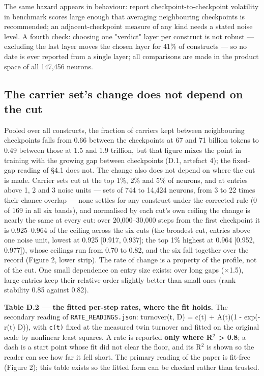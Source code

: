 \documentclass{article}
\begin{document}
The same hazard appears in behaviour: \citet{nishida2025} report checkpoint-to-checkpoint volatility in benchmark scores large enough that averaging neighbouring checkpoints is recommended; an adjacent-checkpoint measure of any kind needs a stated noise level. A fourth check: choosing one "verdict" layer per construct is not robust --- excluding the last layer moves the chosen layer for 41\% of constructs --- so no date is ever reported from a single layer; all comparisons are made in the product space of all 147,456 neurons.

\subsection{The carrier set's change does not depend on the cut}

Pooled over all constructs, the fraction of carriers kept between neighbouring checkpoints falls from 0.66 between the checkpoints at 67 and 71 billion tokens to 0.49 between those at 1.5 and 1.9 trillion, but that figure mixes the point in training with the growing gap between checkpoints (D.1, artefact 4); the fixed-gap reading of \S4.1 does not. The change also does not depend on where the cut is made. Carrier sets cut at the top 1\%, 2\% and 5\% of neurons, and at entries above 1, 2 and 3 noise units --- sets of 744 to 14,424 neurons, from 3 to 22 times their chance overlap --- none settles for any construct under the corrected rule (0 of 169 in all six bands), and normalised by each cut's own ceiling the change is nearly the same at every cut: over 20,000--30,000 steps from the first checkpoint it is 0.925--0.964 of the ceiling across the six cuts (the broadest cut, entries above one noise unit, lowest at 0.925 [0.917, 0.937]; the top 1\% highest at 0.964 [0.952, 0.977]), whose ceilings run from 0.70 to 0.82, and the six fall together over the record (Figure 2, lower strip). The rate of change is a property of the profile, not of the cut. One small dependence on entry size exists: over long gaps ($\times$1.5), large entries keep their relative order slightly better than small ones (rank stability 0.85 against 0.82).

\textbf{Table D.2 --- the fitted per-step rates, where the fit holds.} The secondary reading of \texttt{RATE\_READINGS.json}: turnover(t, D) = c(t) + A(t)(1 - exp(-r(t) D)), with \texttt{c(t)} fixed at the measured twin turnover and fitted on the original scale by nonlinear least squares. A rate is reported \textbf{only where R$^2$ > 0.8}; a dash is a start point whose fit did not clear the floor, and its R$^2$ is shown so the reader can see how far it fell short. The primary reading of the paper is fit-free (Figure 2); this table exists so the fitted form can be checked rather than trusted.
\end{document}
